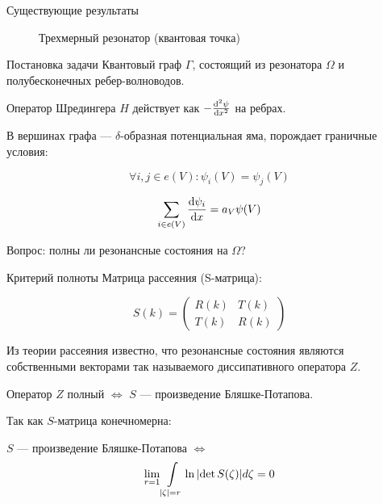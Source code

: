 \documentclass{beamer}
\begin{document}
\begin{frame}{Существующие результаты}
\begin{figure}
\begin{tikzpicture}[scale=0.8]

\end{tikzpicture}
\caption{Трехмерный резонатор (квантовая точка)}
\end{figure}
\end{frame}


% 
\begin{frame}{Постановка задачи}
Квантовый граф $\Gamma$, состоящий из резонатора $\Omega$ и полубесконечных ребер-волноводов.

Оператор Шредингера $H$ действует как $-\dv[2]{\psi}{x}$ на ребрах.

В вершинах графа — $\delta$-образная потенциальная яма, порождает граничные условия:

\[
\forall i, j \in e(V): \psi_i(V) = \psi_j(V)
\]

\[
\sum\limits_{i \in e(V)} \dv{\psi_i}{x} (V) = a_V \psi(V)
\]

Вопрос: полны ли резонансные состояния на $\Omega$?
\end{frame}


\begin{frame}{Критерий полноты}
Матрица рассеяния (S-матрица):

\[
S(k) = \begin{pmatrix} R(k) & T(k) \\ T(k) & R(k) \end{pmatrix}
\]

Из теории рассеяния известно, что резонансные состояния являются собственными векторами так называемого диссипативного оператора $Z$.

\begin{theorem}
Оператор $Z$ полный $\iff$ $S$ — произведение Бляшке-Потапова.
\end{theorem}

Так как $S$-матрица конечномерна:
\begin{theorem}
$S$ — произведение Бляшке-Потапова $\iff$
\begin{equation*}\label{eq:blaschke}
\lim\limits_{r = 1} \int\limits_{\abs{\zeta} = r} \ln \abs{\det S(\zeta)} d \zeta = 0
\end{equation*}
\end{theorem}
\end{frame}
\end{document}
